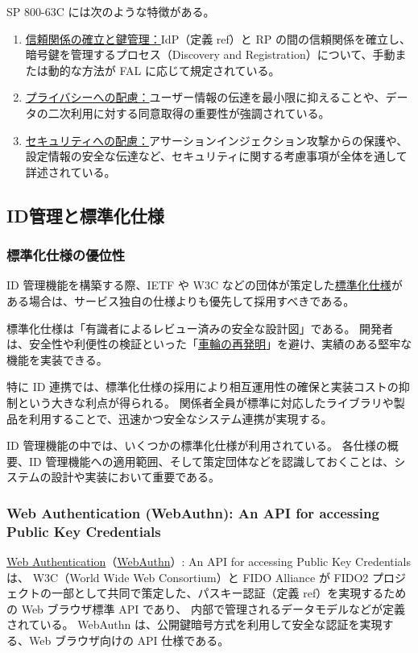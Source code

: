 \documentclass[uplatex]{jsarticle}
\def\ref#1{ref}%
\def\label#1{}%
\begin{document}
SP 800-63C には次のような特徴がある。

\begin{enumerate}
\item \underline{信頼関係の確立と鍵管理：}IdP（定義 \ref{dfn:idp}）と RP の間の信頼関係を確立し、暗号鍵を管理するプロセス（Discovery and Registration）について、手動または動的な方法が FAL に応じて規定されている。
\item \underline{プライバシーへの配慮：}ユーザー情報の伝達を最小限に抑えることや、データの二次利用に対する同意取得の重要性が強調されている。
\item \underline{セキュリティへの配慮：}アサーションインジェクション攻撃からの保護や、設定情報の安全な伝達など、セキュリティに関する考慮事項が全体を通して詳述されている。
\end{enumerate}

\subsection{ID管理と標準化仕様}

\subsubsection{標準化仕様の優位性}

ID 管理機能を構築する際、IETF や W3C などの団体が策定した\underline{標準化仕様}がある場合は、サービス独自の仕様よりも優先して採用すべきである。

標準化仕様は「有識者によるレビュー済みの安全な設計図」である。
開発者は、安全性や利便性の検証といった「\underline{車輪の再発明}」を避け、実績のある堅牢な機能を実装できる。

特に ID 連携では、標準化仕様の採用により相互運用性の確保と実装コストの抑制という大きな利点が得られる。
関係者全員が標準に対応したライブラリや製品を利用することで、迅速かつ安全なシステム連携が実現する。

ID 管理機能の中では、いくつかの標準化仕様が利用されている。
各仕様の概要、ID 管理機能への適用範囲、そして策定団体などを認識しておくことは、システムの設計や実装において重要である。

\subsubsection{Web Authentication (WebAuthn): An API for accessing Public Key Credentials}

\begin{dfn}[WebAuthn]\label{dfn:ch5-webauthn}
\underline{Web Authentication}（\underline{WebAuthn}）: An API for accessing Public Key Credentials は、
W3C（World Wide Web Consortium）と FIDO Alliance が FIDO2 プロジェクトの一部として共同で策定した、パスキー認証（定義 \ref{dfn:passkey}）を実現するための Web ブラウザ標準 API であり、
内部で管理されるデータモデルなどが定義されている。
WebAuthn は、公開鍵暗号方式を利用して安全な認証を実現する、Web ブラウザ向けの API 仕様である。
\end{dfn}
\end{document}
